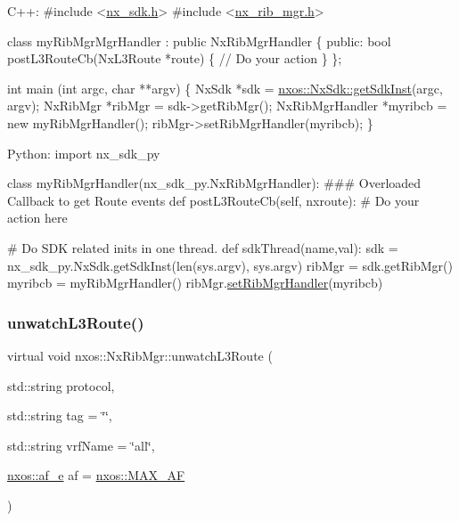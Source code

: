 \begin{DoxyCode}
C++:
\textcolor{preprocessor}{   #include <\mbox{\hyperlink{nx__sdk_8h}{nx\_sdk.h}}>}
\textcolor{preprocessor}{   #include <\mbox{\hyperlink{nx__rib__mgr_8h}{nx\_rib\_mgr.h}}>}

   \textcolor{keyword}{class }myRibMgrMgrHandler : \textcolor{keyword}{public} NxRibMgrHandler \{
      \textcolor{keyword}{public}:
         \textcolor{keywordtype}{bool} postL3RouteCb(NxL3Route *route) \{
              \textcolor{comment}{// Do your action}
         \}
   \};

   \textcolor{keywordtype}{int}  main (\textcolor{keywordtype}{int} argc, \textcolor{keywordtype}{char} **argv)
   \{
        NxSdk    *sdk = \mbox{\hyperlink{classnxos_1_1_nx_sdk_a5050e2d26c40744b4fc7862068a83f39}{nxos::NxSdk::getSdkInst}}(argc, argv);
        NxRibMgr *ribMgr = sdk->getRibMgr();
        NxRibMgrHandler *myribcb = \textcolor{keyword}{new} myRibMgrHandler();
        ribMgr->setRibMgrHandler(myribcb);
   \}

Python:
   \textcolor{keyword}{import} nx\_sdk\_py

   \textcolor{keyword}{class }myRibMgrHandler(nx\_sdk\_py.NxRibMgrHandler):
\textcolor{preprocessor}{   ### Overloaded Callback to get Route events}
         def postL3RouteCb(self, nxroute):
\textcolor{preprocessor}{             # Do your action here}

\textcolor{preprocessor}{   # Do SDK related inits in one thread.}
   def sdkThread(name,val):
       sdk = nx\_sdk\_py.NxSdk.getSdkInst(len(sys.argv), sys.argv)
       ribMgr = sdk.getRibMgr()
       myribcb = myRibMgrHandler()
       ribMgr.\mbox{\hyperlink{classnxos_1_1_nx_rib_mgr_ac42dd29e34f9c508614733dbec518b99}{setRibMgrHandler}}(myribcb)
\end{DoxyCode}
 \mbox{\label{classnxos_1_1_nx_rib_mgr_a1dc61ed1d830f50ea947707576d75b99}} 
\subsubsection{\texorpdfstring{unwatch\+L3\+Route()}{unwatchL3Route()}}
{\footnotesize\ttfamily virtual void nxos\+::\+Nx\+Rib\+Mgr\+::unwatch\+L3\+Route (\begin{DoxyParamCaption}\item[{std\+::string}]{protocol,  }\item[{std\+::string}]{tag = {\ttfamily \char`\"{}\char`\"{}},  }\item[{std\+::string}]{vrf\+Name = {\ttfamily \char`\"{}all\char`\"{}},  }\item[{\mbox{\hyperlink{namespacenxos_a3a667f48b94db10aa398940dc5bf72d7}{nxos\+::af\+\_\+e}}}]{af = {\ttfamily \mbox{\hyperlink{namespacenxos_a3a667f48b94db10aa398940dc5bf72d7a18d0f422c857ebdfed79deb2b58ab119}{nxos\+::\+M\+A\+X\+\_\+\+AF}}} }\end{DoxyParamCaption})\hspace{0.3cm}{\ttfamily [pure virtual]}}

